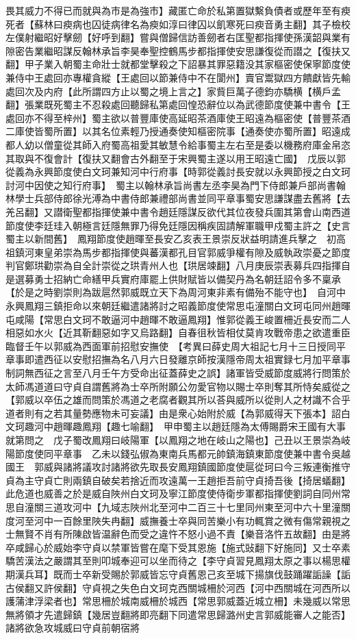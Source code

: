 畏其威力不得已而就與為市是為強市】藏匿亡命於私第置獄繫負債者或歷年至有瘐死者【蘇林曰瘐病也囚徒病律名為瘐如淳曰律囚以飢寒死曰瘐音勇主翻】其子檢校左僕射繼昭好擊劒【好呼到翻】嘗與僧歸信訪善劒者右匡聖都指揮使孫漢韶與業有隙密告業繼昭謀反翰林承旨李昊奉聖控鶴馬步都指揮使安思謙復從而譛之【復扶又翻】甲子業入朝蜀主命壯士就都堂擊殺之下詔暴其罪惡籍没其家樞密使保寧節度使兼侍中王處回亦專權貪縱【王處回以節兼侍中不在閬州】賣官鬻獄四方饋獻皆先輸處回次及内府【此所謂四方止以蜀之境上言之】家貲巨萬子德鈞亦驕横【横戶孟翻】張業既死蜀主不忍殺處回聽歸私第處回惶恐辭位以為武德節度使兼中書令【王處回亦不得至梓州】蜀主欲以普豐庫使高延昭茶酒庫使王昭遠為樞密使【普豐茶酒二庫使皆蜀所置】以其名位素輕乃授通奏使知樞密院事【通奏使亦蜀所置】昭遠成都人幼以僧童從其師入府蜀高祖愛其敏慧令給事蜀主左右至是委以機務府庫金帛恣其取與不復會計【復扶又翻會古外翻至于宋興蜀主遂以用王昭遠亡國】　戊辰以郭從義為永興節度使白文珂兼知河中行府事【時郭從義討長安就以永興節授之白文珂討河中因使之知行府事】　蜀主以翰林承旨尚書左丞李昊為門下侍郎兼戶部尚書翰林學士兵部侍郎徐光溥為中書侍郎兼禮部尚書並同平章事蜀安思謙謀盡去舊將【去羌呂翻】又譛衛聖都指揮使兼中書令趙廷隱謀反欲代其位夜發兵圍其第會山南西道節度使李廷珪入朝極言廷隱無罪乃得免廷隱因稱疾固請解軍職甲戍蜀主許之【史言蜀主以新間舊】　鳳翔節度使趙暉至長安乙亥表王景崇反狀益明請進兵擊之　初高祖鎮河東皇弟崇為馬步都指揮使與蕃漢都孔目官郭威爭權有隙及威執政崇憂之節度判官鄭珙勸崇為自全計崇從之珙青州人也【珙居竦翻】八月庚辰崇表募兵四指揮自是選募勇士招納亡命繕甲兵實府庫罷上供財賦皆以備契丹為名朝廷詔令多不稟承【於是之時劉崇則為跋扈然郭威既立天下為周河東非素有備殆不能守也】　自河中永興鳳翔三鎮拒命以來朝廷繼遣諸將討之昭義節度使常思屯潼關白文珂屯同州趙暉屯咸陽【常思白文珂不敢逼河中趙暉不敢逼鳳翔】惟郭從義王峻置柵近長安而二人相惡如水火【近其靳翻惡如字又烏路翻】自春徂秋皆相仗莫肯攻戰帝患之欲遣重臣臨督壬午以郭威為西面軍前招慰安撫使　【考異曰薛史周大祖記七月十三日授同平章事即遣西征以安慰招撫為名八月六日發離京師按漢隱帝周太祖實録七月加平章事制詞無西征之言至八月壬午方受命出征蓋薛史之誤】諸軍皆受威節度威將行問策於太師馮道道曰守貞自謂舊將為士卒所附願公勿愛官物以賜士卒則奪其所恃矣威從之【郭威以卒伍之雄而問策於馮道之老腐者觀其所以荅與威所以從則人之材識不合乎道者則有之若其量勢應物未可妄議】由是衆心始附於威【為郭威得天下張本】詔白文珂趣河中趙暉趣鳳翔【趣七喻翻】　甲申蜀主以趙廷隱為太傅賜爵宋王國有大事就第問之　戊子蜀改鳳翔曰岐陽軍【以鳳翔之地在岐山之陽也】己丑以王景崇為岐陽節度使同平章事　乙未以錢弘俶為東南兵馬都元帥鎮海鎮東節度使兼中書令吳越國王　郭威與諸將議攻討諸將欲先取長安鳳翔鎮國節度使扈從珂曰今三叛連衡推守貞為主守貞亡則兩鎮自破矣若捨近而攻遠萬一王趙拒吾前守貞掎吾後【掎居蟻翻】此危道也威善之於是威自陜州白文珂及寧江節度使侍衛步軍都指揮使劉詞自同州常思自潼關三道攻河中【九域志陜州北至河中二百三十七里同州東至河中六十里潼關度河至河中一百餘里陜失冉翻】威撫養士卒與同苦樂小有功輒賞之微有傷常親視之士無賢不肖有所陳啟皆温辭色而受之違忤不怒小過不責【樂音洛忤五故翻】由是將卒咸歸心於威始李守貞以禁軍皆嘗在麾下受其恩施【施式䜴翻下好施同】又士卒素驕苦漢法之嚴謂其至則叩城奉迎可以坐而待之【李守貞習見鳳翔太原之事以楊思權期漢兵耳】既而士卒新受賜於郭威皆忘守貞舊恩己亥至城下揚旗伐鼓踊躍詬譟【詬古侯翻又許侯翻】守貞視之失色白文珂克西關城柵於河西【河中西關城在河西所以護蒲津浮梁者也】常思柵於城南威柵於城西【常思郭威蓋近城立柵】未幾威以常思無將領才先遣歸鎮【幾居豈翻將即亮翻下同遣常思歸潞州史言郭威能審人之能否】諸將欲急攻城威曰守貞前朝宿將